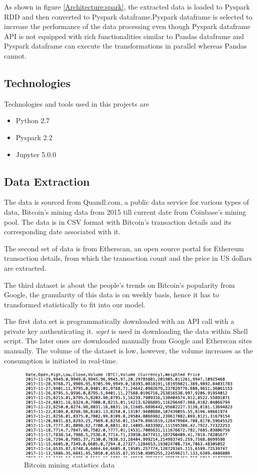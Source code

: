 \documentclass[sigconf]{acmart}
\begin{document}
As shown in figure \ref{Architecture:spark}, the extracted data is loaded to Pyspark RDD and then converted to Pyspark dataframe.Pyspark dataframe is selected to increase the performance of the data processing even though Pyspark dataframe API is not equipped with rich functionalities  similar to Pandas dataframe and Pyspark dataframe can execute the transformations in parallel whereas Pandas cannot. 

\subsection{Technologies}
Technologies and tools used in this projects are
\begin{itemize}
\item Python 2.7 
\item Pyspark 2.2
\item Jupyter 5.0.0
\end{itemize}


\subsection{Data Extraction}
The data is sourced from Quandl.com, a public data service for various types of data, Bitcoin's mining data from 2015 till current date from Coinbase's mining pool. The data is in CSV format with Bitcoin's transaction details and its corresponding date associated with it.

The second set of data is from Etherscan, an open source portal for Ethereum transaction details, from which the transaction count and the price in US dollars are extracted.

The third dataset is about the people's trends on Bitcoin's popularity from Google, the granularity of this data is on weekly basis, hence it has to transformed statistically to fit into our model.

The first data set is programmatically downloaded with an API call with a private key authenticating it. {\em wget } is used in downloading the data within Shell script.
The later ones are downloaded manually from Google and Etherscan sites manually. The volume of the dataset is low, however, the volume increases as the consumption is initiated in real-time.

\begin{figure}[!ht]
  \centering\includegraphics[width=\columnwidth]{PROJECT/images/Source1data.png}
  \caption{Bitcoin mining statistics data}
  \label{}
\end{figure}
\end{document}
